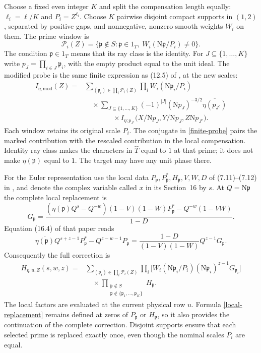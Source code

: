\documentclass[10pt,reqno,a4paper]{amsart}
\theoremstyle{remark}
\newcommand{\N}{\mathrm N}
\newcommand{\pp}{\mathfrak p}
\begin{document}
Choose a fixed even integer $K$ and split the compensation length equally:
$\ell_i=\ell/K$ and $P_i=Z^{\ell_i}$. Choose $K$ pairwise disjoint
compact supports in $(1,2)$, separated by positive gaps, and nonnegative,
nonzero smooth weights $W_i$ on them. The prime window is
\[
 \mathcal P_i(Z)=\{
  \pp\notin S:\pp\in1_T,\ W_i(\N\pp/P_i)\ne0\}.
\]
The condition $\pp\in1_T$ means that its ray class is the identity.
For $J\subseteq\{1,\ldots,K\}$ write
$p_J=\prod_{i\in J}\pp_i$, with the empty product equal to the unit ideal.
The modified probe is the same finite expression as (12.5) of
\cite{q30}, at the new scales:
\begin{equation}\label{finite-probe}
\begin{aligned}
 I_{\eta,\mathrm{mod}}(Z)
 ={}&\sum_{(\pp_i)\in\prod_i\mathcal P_i(Z)}
           \prod_i W_i(\N\pp_i/P_i)\\
 &\quad\times\sum_{J\subseteq\{1,\ldots,K\}}
      (-1)^{|J|}(\N p_J)^{-3/2}\overline{\eta(p_{J^c})}\\
 &\qquad\qquad\times I_{\eta;p_{J^c}}
       \bigl(X/\N p_J,Y/\N p_J,Z\N p_{J^c}\bigr).
\end{aligned}
\end{equation}
Each window retains its original scale $P_i$. The conjugate in
\eqref{finite-probe} pairs the marked contribution with the rescaled
contribution in the local compensation. Identity ray class makes the
characters in $\widehat T$ equal to $1$ at that prime; it does not make
$\eta(\pp)$ equal to $1$. The target may have any unit phase there.

For the Euler representation use the local data
$P_\pp,P_\pp^*,H_\pp,V,W,D$ of (7.11)--(7.12) in \cite{q30}, and denote
the complex variable called $x$ in its Section~16 by $s$. At $Q=\N\pp$
the complete local replacement is
\begin{equation}\label{local-replacement}
 G_\pp=
 \frac{
   (\overline{\eta(\pp)}Q^s-Q^{-w})(1-V)(1-W)P_\pp^*
       -Q^{-w}(1-VW)}{1-D}.
\end{equation}
Equation (16.4) of that paper reads
\[
 \overline{\eta(\pp)}Q^{s+z-1}P_\pp^*-Q^{z-w-1}P_\pp
 =\frac{1-D}{(1-V)(1-W)}Q^{z-1}G_\pp.
\]
Consequently the full correction is
\begin{equation}\label{full-correction}
\begin{aligned}
 H_{\eta,u,Z}(s,w,z)
 ={}&\sum_{(\pp_i)\in\prod_i\mathcal P_i(Z)}
       \prod_i\bigl[
        W_i(\N\pp_i/P_i)(\N\pp_i)^{z-1}G_{\pp_i}\bigr]\\
 &\quad\times
       \prod_{\substack{\pp\notin S\\
                  \pp\notin\{\pp_1,\ldots,\pp_K\}}}H_\pp.
\end{aligned}
\end{equation}
The local factors are evaluated at the current physical row $u$. Formula
\eqref{local-replacement} remains defined at zeros of $P_\pp$ or
$H_\pp$, so it also provides the continuation of the complete correction.
Disjoint supports ensure that each selected prime is replaced exactly
once, even though the nominal scales $P_i$ are equal.
\end{document}
